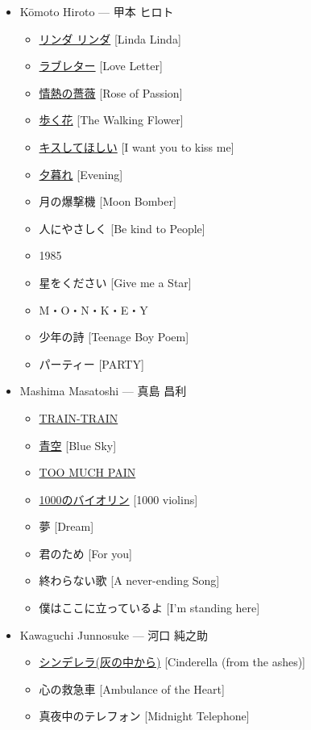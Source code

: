 \begin{itemize}
	\item Kōmoto Hiroto --- 甲本 ヒロト
	\begin{itemize}
		\item \href{https://www.youtube.com/watch?v=RYC71PAuIKE}{リンダ リンダ} [Linda Linda]
		\item \href{https://www.youtube.com/watch?v=5yslQYshIAI}{ラブレター} [Love Letter]
		\item \href{https://www.youtube.com/watch?v=-p0Yqcx53O8}{情熱の薔薇} [Rose of Passion]
		\item \href{https://www.youtube.com/watch?v=t0rffmN7c6w}{歩く花} [The Walking Flower]
		\item \href{https://www.youtube.com/watch?v=BT-8_TFxohI}{キスしてほしい} [I want you to kiss me]
		\item \href{https://www.youtube.com/watch?v=xnQYtogdxyg}{夕暮れ} [Evening]
		\item 月の爆撃機 [Moon Bomber]
		\item 人にやさしく [Be kind to People]
		\item 1985
		\item 星をください [Give me a Star]
		\item M・O・N・K・E・Y
		\item 少年の詩 [Teenage Boy Poem]
		\item パーティー [PARTY]
	\end{itemize}
	
	\item Mashima Masatoshi --- 真島 昌利	
	\begin{itemize}
		\item \href{https://www.youtube.com/watch?v=BSkLe-EOq5U}{TRAIN-TRAIN}
		\item \href{https://www.youtube.com/watch?v=PQXMU1A8CjI}{青空} [Blue Sky]
		\item \href{https://www.youtube.com/watch?v=9yY5lwBT4mk}{TOO MUCH PAIN}
		\item \href{https://www.youtube.com/watch?v=egNok6oeMA0}{1000のバイオリン} [1000 violins]
		\item 夢 [Dream]
		\item 君のため [For you]
		\item 終わらない歌 [A never-ending Song]
		\item 僕はここに立っているよ [I'm standing here]	
	\end{itemize}
	
	\item Kawaguchi Junnosuke --- 河口 純之助	
	\begin{itemize}
		\item \href{https://www.youtube.com/watch?v=J4LKAFe82_w}{シンデレラ(灰の中から)} [Cinderella (from the ashes)]
		\item 心の救急車 [Ambulance of the Heart]
		\item 真夜中のテレフォン [Midnight Telephone]
	\end{itemize}
\end{itemize}

